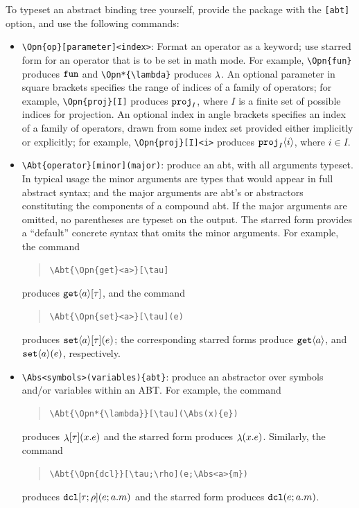 \documentclass[11pt]{article}
\begin{document}
To typeset an abstract binding tree yourself, provide the package with the \verb|[abt]| option, and use the following commands:
\begin{itemize}
  \item \verb|\Opn{op}[parameter]<index>|: Format an operator as a keyword; use starred form for an operator that is to be set in math mode.  For example, \verb|\Opn{fun}| produces $\Opn{fun}$ and \verb|\Opn*{\lambda}| produces $\Opn*{\lambda}$.  An optional parameter in square brackets specifies the range of indices of a family of operators; for example, \verb|\Opn{proj}[I]| produces $\Opn{proj}[I]$, where $I$ is a finite set of possible indices for projection.  An optional index in angle brackets specifies an index of a family of operators, drawn from some index set provided either implicitly or explicitly; for example, \verb|\Opn{proj}[I]<i>| produces $\Opn{proj}[I]<i>$, where $i\in I$.

  \item \verb|\Abt{operator}[minor](major)|: produce an abt, with all arguments typeset.  In typical usage the minor arguments are types that would appear in full abstract syntax; and the major arguments are abt's or abstractors constituting the components of a compound abt.  If the major arguments are omitted, no parentheses are typeset on the output.  The starred form provides a ``default'' concrete syntax that omits the minor arguments.  For example, the command
  \begin{quote}
\begin{verbatim}
\Abt{\Opn{get}<a>}[\tau]
\end{verbatim}
  \end{quote}
  produces $\Abt{\Opn{get}<a>}[\tau]$, and the command
  \begin{quote}
\begin{verbatim}
\Abt{\Opn{set}<a>}[\tau](e)
\end{verbatim}
  \end{quote}
  produces $\Abt{\Opn{set}<a>}[\tau](e)$; the corresponding starred forms produce $\Abt*{\Opn{get}<a>}[\tau]$, and $\Abt*{\Opn{set}<a>}[\tau](e)$, respectively.

  \item \verb|\Abs<symbols>(variables){abt}|: produce an abstractor over symbols and/or variables within an ABT.  For example, the command
  \begin{quote}
\begin{verbatim}
\Abt{\Opn*{\lambda}}[\tau](\Abs(x){e})
\end{verbatim}
  \end{quote}
  produces $\Abt{\Opn*{\lambda}}[\tau](\Abs(x){e})$ and the starred form produces $\Abt*{\Opn*{\lambda}}[\tau](\Abs(x){e})$.  Similarly, the command
  \begin{quote}
\begin{verbatim}
\Abt{\Opn{dcl}}[\tau;\rho](e;\Abs<a>{m})
\end{verbatim}
  \end{quote}
  produces $\Abt{\Opn{dcl}}[\tau;\rho](e;\Abs<a>{m})$ and the starred form produces $\Abt*{\Opn{dcl}}[\tau\,\rho](e;\Abs<a>{m})$.


\end{itemize}
\end{document}
